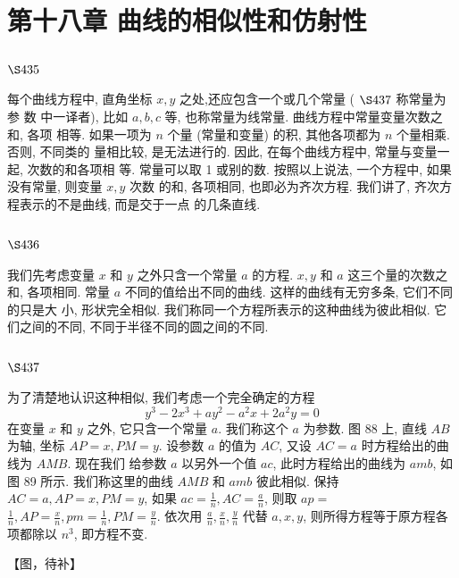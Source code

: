 \chapter{第十八章 曲线的相似性和仿射性}

\section{$\S 435$}

每个曲线方程中, 直角坐标 $x, y$ 之处,还应包含一个或几个常量 ( $\S 437$ 称常量为参 数 中一译者), 比如 $a, b, c$ 等, 也称常量为线常量. 曲线方程中常量变量次数之和, 各项 相等. 如果一项为 $n$ 个量 (常量和变量) 的积, 其他各项都为 $n$ 个量相乘. 否则, 不同类的 量相比较, 是无法进行的. 因此, 在每个曲线方程中, 常量与变量一起, 次数的和各项相 等. 常量可以取 1 或别的数. 按照以上说法, 一个方程中, 如果没有常量, 则变量 $x, y$ 次数 的和, 各项相同, 也即必为齐次方程. 我们讲了, 齐次方程表示的不是曲线, 而是交于一点 的几条直线.

\section{$\S 436$}

我们先考虑变量 $x$ 和 $y$ 之外只含一个常量 $a$ 的方程. $x, y$ 和 $a$ 这三个量的次数之和, 各项相同. 常量 $a$ 不同的值给出不同的曲线. 这样的曲线有无穷多条, 它们不同的只是大 小, 形状完全相似. 我们称同一个方程所表示的这种曲线为彼此相似. 它们之间的不同, 不同于半径不同的圆之间的不同.

\section{$\S 437$}

为了清楚地认识这种相似, 我们考虑一个完全确定的方程
\[
y^{3}-2 x^{3}+a y^{2}-a^{2} x+2 a^{2} y=0
\]
在变量 $x$ 和 $y$ 之外, 它只含一个常量 $a$. 我们称这个 $a$ 为参数. 图 88 上, 直线 $A B$ 为轴, 坐标 $A P=x, P M=y$. 设参数 $a$ 的值为 $A C$, 又设 $A C=a$ 时方程给出的曲线为 $A M B$. 现在我们 给参数 $a$ 以另外一个值 $a c$, 此时方程给出的曲线为 $a m b$, 如图 89 所示. 我们称这里的曲线 $A M B$ 和 $a m b$ 彼此相似. 保持 $A C=a, A P=x, P M=y$, 如果 $a c=\frac{1}{n}, A C=\frac{a}{n}$, 则取 $a p=$ $\frac{1}{n}, A P=\frac{x}{n}, p m=\frac{1}{n}, P M=\frac{y}{n}$. 依次用 $\frac{a}{n}, \frac{x}{n}, \frac{y}{n}$ 代替 $a, x, y$, 则所得方程等于原方程各 项都除以 $n^{3}$, 即方程不变.


【图，待补】

